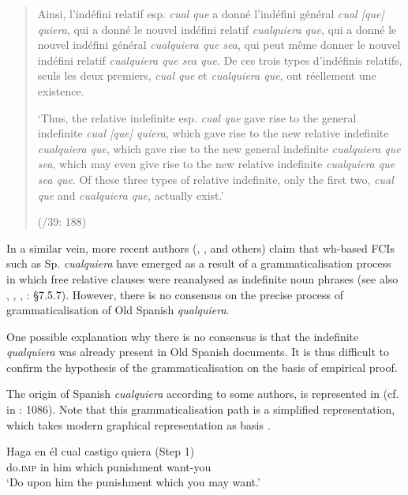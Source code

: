 \begin{quote}
Ainsi, l’indéfini relatif esp. \textit{cual que} a donné l’indéfini général \textit{cual [que] quiera}, qui a donné le nouvel indéfini relatif \textit{cualquiera que}, qui a donné le nouvel indéfini général \textit{cualquiera que sea}, qui peut même donner le nouvel indéfini relatif \textit{cualquiera que sea que.} De ces trois types d’indéfinis relatifs, seuls les deux premiers, \textit{cual que} et \textit{cualquiera que}, ont réellement une existence.

‘Thus, the relative indefinite esp. \textit{cual que} gave rise to the general indefinite \textit{cual [que] quiera}, which gave rise to the new relative indefinite \textit{cualquiera que}, which gave rise to the new general indefinite \textit{cualquiera que sea}, which may even give rise to the new relative indefinite \textit{cualquiera que sea que}. Of these three types of relative indefinite, only the first two, \textit{cual que} and \textit{cualquiera que}, actually exist.’

    (\citealt{Lombard1938}/39: 188)
\end{quote}

In a similar vein, more recent authors (\citealt{Company-CompanyPozas-Loyo2009}, \citealt{Haspelmath1997}, and others) claim that wh-based FCIs such as Sp. \textit{cualquiera} have emerged as a result of a grammaticalisation process in which free relative clauses were reanalysed as indefinite noun phrases (see also \citealt{Palomo1934}, \citealt{Company-CompanyPozas-Loyo2009}, \citealt{Alconchel2012}, \citealt{Brucart1999}: §7.5.7). However, there is no consensus on the precise process of grammaticalisation of Old Spanish \textit{qualquiera}. 

One possible explanation why there is no consensus is that the indefinite \textit{qualquiera} was already present in Old Spanish documents. It is thus difficult to confirm the hypothesis of the grammaticalisation on the basis of empirical proof.

The origin of Spanish \textit{cualquiera} according to some authors, is represented in  (cf. \citealt{Cuervo1893} in \citealt{cp2009}: 1086). Note that this grammaticalisation path is a simplified representation, which takes modern graphical representation as basis \citep{Elvira2007}.


\ea 
\ea 
\gll Haga en él cual castigo quiera  \hfill{(Step 1)}\\
do.\textsc{imp} in him which punishment want-you\\ 
\glt ‘Do upon him the punishment which you may want.’

